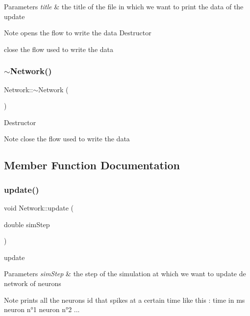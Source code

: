 \begin{DoxyParams}{Parameters}
{\em title} & the title of the file in which we want to print the data of the update\\
\hline
\end{DoxyParams}
\begin{DoxyNote}{Note}
opens the flow to write the data Destructor

close the flow used to write the data 
\end{DoxyNote}
\mbox{\label{class_network_a7a4e19cdb4bf0c7ecf82baa643831492}} 
\subsubsection{\texorpdfstring{$\sim$\+Network()}{~Network()}}
{\footnotesize\ttfamily Network\+::$\sim$\+Network (\begin{DoxyParamCaption}{ }\end{DoxyParamCaption})}

Destructor

\begin{DoxyNote}{Note}
close the flow used to write the data 
\end{DoxyNote}


\subsection{Member Function Documentation}
\mbox{\label{class_network_a7ff4ea46a5eeafd9d9f16add01cb06b7}} 
\subsubsection{\texorpdfstring{update()}{update()}}
{\footnotesize\ttfamily void Network\+::update (\begin{DoxyParamCaption}\item[{double}]{sim\+Step }\end{DoxyParamCaption})}

update


\begin{DoxyParams}{Parameters}
{\em sim\+Step} & the step of the simulation at which we want to update de network of neurons\\
\hline
\end{DoxyParams}
\begin{DoxyNote}{Note}
prints all the neurons id that spikes at a certain time like this \+: time in ms neuron n°1 neuron n°2 ... 
\end{DoxyNote}
\mbox{\label{class_network_a4963f8d1528bbb233b37b24f90f00560}} 

